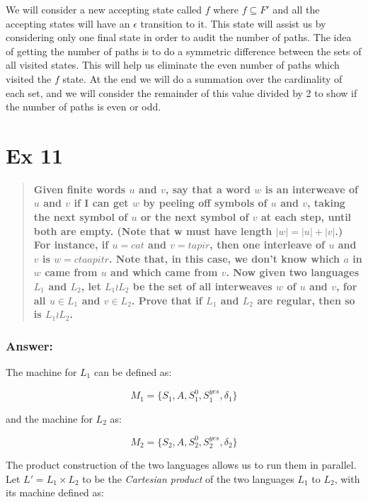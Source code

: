 \documentclass[titlepage]{article}\usepackage[]{graphicx}\usepackage[]{color}
\begin{document}
We will consider a new accepting state called $f$ where $f \subseteq F'$ and
all the accepting states will have an $\epsilon$ transition to it. This state
will assist us by considering only one final state in order to audit the number
of paths. The idea of getting the number of paths is to do a symmetric
difference between the sets of all visited states. This will help us eliminate
the even number of paths which visited the $f$ state. At the end we will do a
summation over the cardinality of each set, and we will consider the remainder
of this value divided by 2 to show if the number of paths is even or odd.











\section*{Ex 11} 
\begin{quote} \textbf{Given finite words $u$ and $v$, say that
    a word $w$ is an interweave of $u$ and $v$ if I can get $w$ by peeling off
    symbols of $u$ and $v$, taking the next symbol of $u$ or the next symbol of
    $v$ at each step, until both are empty. (Note that w must have length $|w|
    = |u| + |v|$.) For instance, if $u = cat$ and $v = tapir$, then one
    interleave of $u$ and $v$ is $w = ctaapitr$. Note that, in this case, we
    don't know which $a$ in $w$ came from $u$ and which came from $v$. Now
    given two languages $L_{1}$ and $L_{2}$, let $L_{1} \wr L_{2}$ be the set
    of all interweaves $w$ of $u$ and $v$, for all $u \in L_{1}$ and $v \in
    L_{2}$. Prove that if $L_{1}$ and $L_{2}$ are regular, then so is $L_{1}
    \wr L_{2}$.}
\end{quote}
\subsubsection*{Answer:}

The machine for $L_1$ can be defined as:

\[ 
	M_{1} = \{S_{1}, A, S_{1}^0, S_{1}^{yes}, \delta_{1} \}
\]

and the machine for $L_2$ as:

\[ 
	M_{2} = \{ S_{2}, A, S_{2}^0, S_{2}^{yes}, \delta_{2} \}
\]

The product construction of the two languages allows us to run them in
parallel. Let $L' = L_1 \times L_2$ to be the \textit{Cartesian product} of the
two languages $L_1$ to $L_2$, with its machine defined as:
\end{document}

